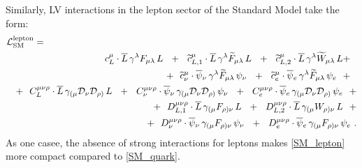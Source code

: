 \documentclass[12pt,preprintnumbers,nofootinbib]{revtex4}
\newcommand{\wt}{\widetilde}
\newcommand{\ov}{\overline}
\newcommand{\md}{\mathcal{D}}
\begin{document}


	Similarly, LV interactions in the lepton sector of the Standard Model
	take the form:
\begin{eqnarray}
\nonumber
\lefteqn{
	\mathcal{L}_{\rm SM}^{\rm lepton} =
	}
	\\
\nonumber
	&&
	\phantom{+~~}
	c_L^\mu \cdot
	\ov{L}\, \gamma^{\lambda} F_{\mu\lambda}\, L
	~~+~~
	\wt{c}_{L,1}^\mu \cdot
	\ov{L}\, \gamma^{\lambda} \wt{F}_{\mu\lambda}\, L
	~~+~~
	\wt{c}_{L,2}^\mu \cdot
	\ov{L}\, \gamma^{\lambda} \wt{W}_{\mu\lambda}\, L
	+~~
	\\
\nonumber
	&&
	+~~
	\wt{c}_{\nu}^\mu \cdot
	\ov{\psi}{}_\nu\, \gamma^{\lambda} \wt{F}_{\mu\lambda}\, \psi_\nu
	~~+~~
	\wt{c}_{e}^\mu \cdot
	\ov{\psi}{}_e\, \gamma^{\lambda} \wt{F}_{\mu\lambda}\, \psi_e
	~~+~~
	\\
\nonumber
	&&
	+~~
	C_L^{\mu\nu\rho} \cdot
	\ov{L}\, \gamma_{(\mu} \md_\nu \md_{\rho)}\, L
	~~+~~
	C_{\nu}^{\mu\nu\rho} \cdot
	\ov{\psi}{}_\nu\, \gamma_{(\mu} \md_\nu \md_{\rho)}\, \psi_\nu
	~~+~~
	C_{e}^{\mu\nu\rho} \cdot
	\ov{\psi}{}_e\, \gamma_{(\mu} \md_\nu \md_{\rho)}\, \psi_e
	~~+
	\\
\label{SM_lepton}
	&&
	+~~
	D_{L,1}^{\mu\nu\rho} \cdot
	\ov{L}\, \gamma_{(\mu} F_{\rho)\nu}\, L
	~~+~~
	D_{L,2}^{\mu\nu\rho} \cdot
	\ov{L}\, \gamma_{(\mu} W_{\rho)\nu}\, L
	~~+
	\\
\nonumber
	&&
	+~~
	D_{\nu}^{\mu\nu\rho} \cdot
	\ov{\psi}{}_\nu\, \gamma_{(\mu} F_{\rho)\nu}\, \psi_\nu
	~~+~~
	D_{e}^{\mu\nu\rho} \cdot
	\ov{\psi}{}_e\, \gamma_{(\mu} F_{\rho)\nu}\, \psi_e
	~.
\end{eqnarray}
	As one casee, the absence of strong interactions for leptons
    makes  \eqref{SM_lepton} more compact compared to  
	\eqref{SM_quark}.
\end{document}
